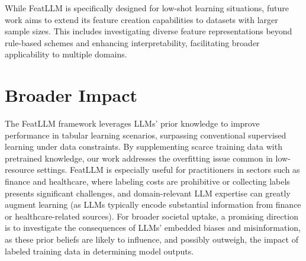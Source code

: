 While \textsf{FeatLLM} is specifically designed for low-shot learning situations, future work aims to extend its feature creation capabilities to datasets with larger sample sizes. This includes investigating diverse feature representations beyond rule-based schemes and enhancing interpretability, facilitating broader applicability to multiple domains.

\section{Broader Impact}
The \textsf{FeatLLM} framework leverages LLMs' prior knowledge to improve performance in tabular learning scenarios, surpassing conventional supervised learning under data constraints. By supplementing scarce training data with pretrained knowledge, our work addresses the overfitting issue common in low-resource settings. \textsf{FeatLLM} is especially useful for practitioners in sectors such as finance and healthcare, where labeling costs are prohibitive or collecting labels presents significant challenges, and domain-relevant LLM expertise can greatly augment learning (as LLMs typically encode substantial information from finance or healthcare-related sources). For broader societal uptake, a promising direction is to investigate the consequences of LLMs’ embedded biases and misinformation, as these prior beliefs are likely to influence, and possibly outweigh, the impact of labeled training data in determining model outputs.

